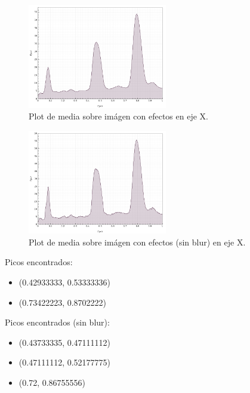 \begin{figure}[H]
	  \vspace{-0.2cm}
	  \centering
	  \includegraphics[width=230px]{imagenes-jtlc/experimento/search-peaks/1/plot-x}
	  \centering
	  \caption{Plot de media sobre im\'agen con efectos en eje X.}
	  \label{fig:sp-1-plot-x}
	  \vspace{-0.15cm}
\end{figure}
\begin{figure}[H]
	  \vspace{-0.2cm}
	  \centering
	  \includegraphics[width=230px]{imagenes-jtlc/experimento/search-peaks/1/plot-x-no-blur}
	  \centering
	  \vspace{-0.4cm}
	  \caption{Plot de media sobre im\'agen con efectos (sin blur) en eje X.}
	  \label{fig:sp-1-plot-x-no-blur}
	  \vspace{-0.15cm}
\end{figure}
Picos encontrados:
\begin{itemize}
	\addtolength{\itemindent}{1cm}
	\item (0.42933333, 0.53333336)
	\item (0.73422223, 0.8702222)
\end{itemize}

Picos encontrados (sin blur):
\begin{itemize}
	\addtolength{\itemindent}{1cm}
	\item (0.43733335, 0.47111112)
	\item (0.47111112, 0.52177775)
	\item (0.72, 0.86755556)
\end{itemize}
	
